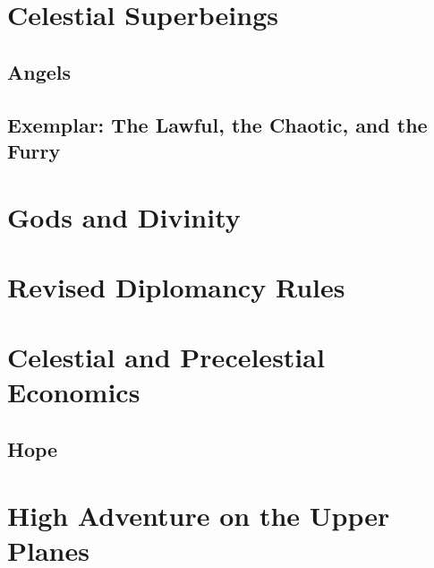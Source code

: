 \documentclass[10pt]{report}
\begin{document}


\chapter{Celestial Superbeings}

\section{Angels}

\section{Exemplar: The Lawful, the Chaotic, and the Furry}

\chapter{Gods and Divinity}

\chapter{Revised Diplomancy Rules}

\chapter{Celestial and Precelestial Economics}

\section{Hope}

\chapter{High Adventure on the Upper Planes}

%
\end{document}
